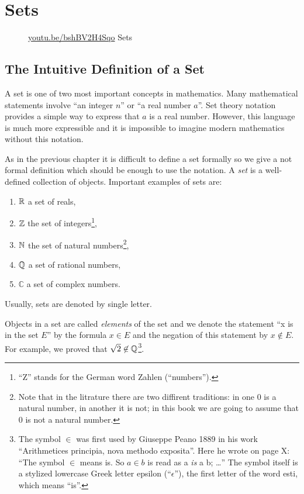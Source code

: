 \chapter{Sets}
\begin{wrapfigure}{l}{4cm}
  \begin{center}
    \vskip -0.5cm
    \vskip 0.25cm
    \href{https://youtu.be/bshBV2H4Sqo}{youtu.be/bshBV2H4Sqo}
    {\footnotesize Sets}
  \end{center}
  \vskip -0.5cm
\end{wrapfigure}
\section{The Intuitive Definition of a Set}
A set is one of two most important concepts in mathematics. Many mathematical
statements involve ``an integer $n$'' or ``a real number $a$''. Set theory
notation provides a simple way to express that $a$ is a real number. However,
this language is much more expressible and it is impossible to imagine modern
mathematics without this notation.

As in the previous chapter it is difficult to define a set formally so we give
a not formal definition which should be enough to use the notation.
A \textit{set} is a well-defined collection of objects. Important examples of
sets are:
\begin{enumerate}
  \item $\mathbb{R}$ a set of reals,
  \item $\mathbb{Z}$ the set of integers\footnote{``Z'' stands for the German word
    Zahlen (``numbers'').},
  \item $\mathbb{N}$ the set of natural numbers\footnote{Note that in the litrature
      there are two diffirent traditions: in one $0$ is a natural number, in
      another it is not; in this book we are going to assume that $0$ is not a
      natural number.
    },
  \item $\mathbb{Q}$ a set of rational numbers,
  \item $\mathbb{C}$ a set of complex numbers.
\end{enumerate}
Usually, sets are denoted by single letter.

Objects in a set are called \textit{elements} of the set and we denote the
statement ``x is in the set $E$'' by the formula $x \in E$ and the negation of
this statement by $x \not\in E$. For example, we proved that
$\sqrt{2} \not\in \mathbb{Q}$\footnote{%
  The symbol $\in$ was first used by Giuseppe Peano 1889 in his work
  ``Arithmetices principia, nova methodo exposita''. Here he wrote on page X:
  ``The symbol $\in$ means is. So $a \in b$ is read as a \textit{is} a b;
  \dots''
  The symbol itself is a stylized lowercase Greek letter epsilon
  (``$\epsilon$''), the first letter of the word  \textgreek{esti}, which means
  ``is''.
}.

